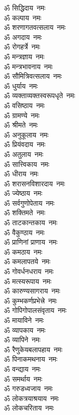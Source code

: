 \begin{multicols}{2}
\begin{flushleft}
ॐ सिद्धिदाय~नमः\hfill{}\\
ॐ कल्पाय~नमः\\
ॐ शरणागतवत्सलाय~नमः\\
ॐ अगदाय~नमः\\
ॐ रोगहर्त्रे~नमः\\
ॐ मन्त्रज्ञाय~नमः\\
ॐ मन्त्रभावनाय~नमः\\
ॐ सौमित्रिवत्सलाय~नमः\\
ॐ धुर्याय~नमः\\
ॐ व्यक्ताव्यक्तस्वरूपधृते~नमः\\
ॐ वसिष्ठाय~नमः\hfill{}\\
ॐ ग्रामण्ये~नमः\\
ॐ श्रीमते~नमः\\
ॐ अनुकूलाय~नमः\\
ॐ प्रियंवदाय~नमः\\
ॐ अतुलाय~नमः\\
ॐ सात्त्विकाय~नमः\\
ॐ धीराय~नमः\\
ॐ शरासनविशारदाय~नमः\\
ॐ ज्येष्ठाय~नमः\\
ॐ सर्वगुणोपेताय~नमः\hfill{}\\
ॐ शक्तिमते~नमः\\
ॐ ताटकान्तकाय~नमः\\
ॐ वैकुण्ठाय~नमः\\
ॐ प्राणिनां प्राणाय~नमः\\
ॐ कमठाय~नमः\\
ॐ कमलापतये~नमः\\
ॐ गोवर्धनधराय~नमः\\
ॐ मत्स्यरूपाय~नमः\\
ॐ कारुण्यसागराय~नमः\\
ॐ कुम्भकर्णप्रभेत्त्रे~नमः\hfill{}\\
ॐ गोपिगोपालसंवृताय~नमः\\
ॐ मायाविने~नमः\\
ॐ व्यापकाय~नमः\\
ॐ व्यापिने~नमः\\
ॐ रैणुकेयबलापहाय~नमः\\
ॐ पिनाकमथनाय~नमः\\
ॐ वन्द्याय~नमः\\
ॐ समर्थाय~नमः\\
ॐ गरुडध्वजाय~नमः\\
ॐ लोकत्रयाश्रयाय~नमः\hfill{}\\
ॐ लोकचरिताय~नमः\\

\end{flushleft}
\end{multicols}
